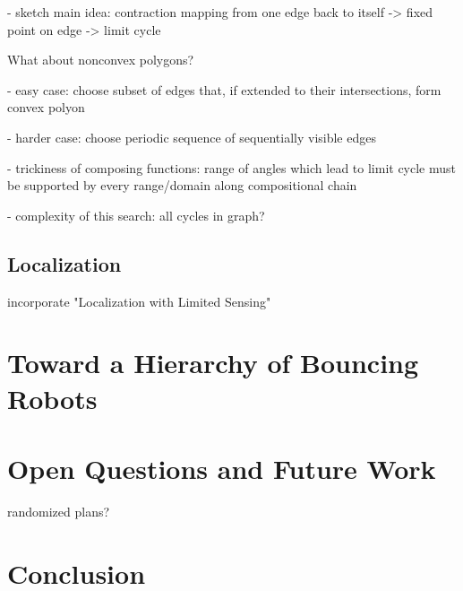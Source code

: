 \documentclass[letterpaper, 10 pt, conference]{ieeeconf}  %
\begin{document}
- sketch main idea: contraction mapping from one edge back to itself -> fixed point on edge -> limit cycle

What about nonconvex polygons?

- easy case: choose subset of edges that, if extended to their intersections, form convex polyon

- harder case: choose periodic sequence of sequentially visible edges

- trickiness of composing functions: range of angles which lead to limit cycle must be supported by every range/domain along compositional chain

- complexity of this search: all cycles in graph?

\subsection{Localization}

incorporate "Localization with Limited Sensing"



\section{Toward a Hierarchy of Bouncing Robots}




\section{Open Questions and Future Work}

randomized plans?

\section{Conclusion}





\end{document}
